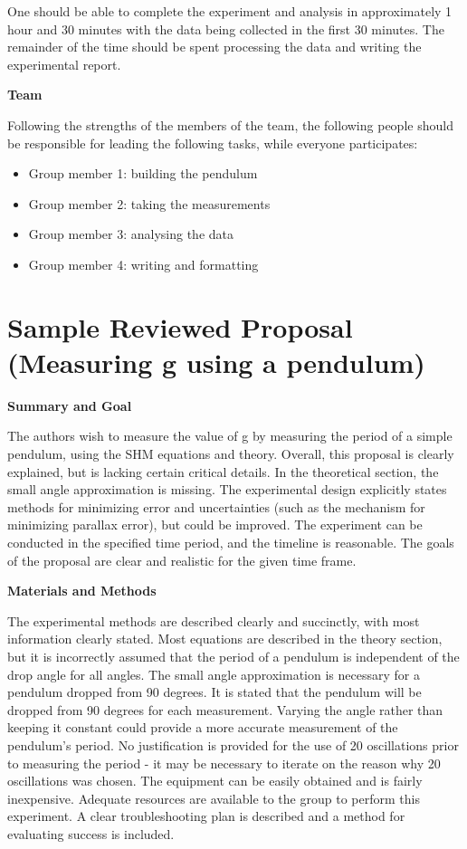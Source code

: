 One should be able to complete the experiment and analysis in approximately 1 hour and 30 minutes with the data being collected in the first 30 minutes. The remainder of the time should be spent processing the data and writing the experimental report. 

\textbf{Team}

Following the strengths of the members of the team, the following people should be responsible for leading the following tasks, while everyone participates:

\begin{itemize}
\item Group member 1: building the pendulum
\item Group member 2: taking the measurements
\item Group member 3: analysing the data
\item Group member 4: writing and formatting
\end{itemize}

 \vspace{0.25cm}
\section{Sample Reviewed Proposal (Measuring g using a pendulum)}
 \vspace{0.25cm}
\textbf{Summary and Goal}

The authors wish to measure the value of g by measuring the period of a simple pendulum, using the SHM equations and theory. Overall, this proposal is clearly explained, but is lacking certain critical details. In the theoretical section, the small angle approximation is missing. The experimental design explicitly states methods for minimizing error and uncertainties (such as the mechanism for minimizing parallax error), but could be improved. The experiment can be conducted in the specified time period, and the timeline is reasonable. The goals of the proposal are clear and realistic for the given time frame. 

\textbf{Materials and Methods}

The experimental methods are described clearly and succinctly, with most information clearly stated. Most equations are described in the theory section, but it is incorrectly assumed that the period of a pendulum is independent of the drop angle for all angles. The small angle approximation is necessary for a pendulum dropped from 90 degrees. It is stated that the pendulum will be dropped from 90 degrees for each measurement. Varying the angle rather than keeping it constant could provide a more accurate measurement of the pendulum's period. No justification is provided for the use of 20 oscillations prior to measuring the period - it may be necessary to iterate on the reason why 20 oscillations was chosen. The equipment can be easily obtained and is fairly inexpensive. Adequate resources are available to the group to perform this experiment. A clear troubleshooting plan is described and a method for evaluating success is included. 

